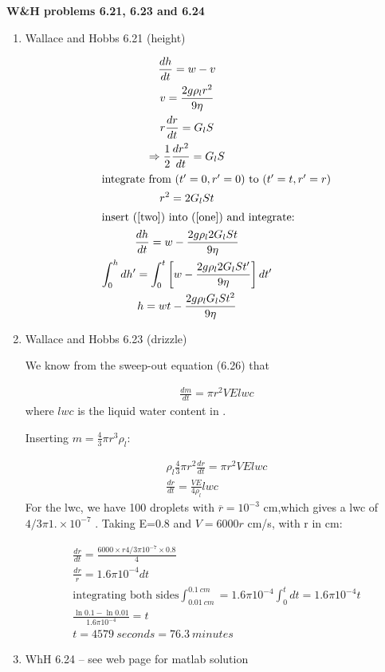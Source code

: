 \documentclass[12pt]{article}
\begin{document}
\begin{center}\textbf{
W\&H problems 6.21, 6.23 and 6.24}
\end{center}

\begin{enumerate}


\item Wallace and Hobbs 6.21 (height)

  \begin{gather}
    \frac{ dh}{dt}  = w - v \label{one} \\
  v = \frac{ 2 g \rho_l r^2}{9 \eta} \label{two}\\
r \frac{ dr}{dt}  = G_l S \\
\Rightarrow \frac{ 1}{2}\frac{dr^2 }{dt}   = G_l S \\
\intertext{integrate from $(t^\prime=0,r^\prime=0)$ to $(t^\prime=t,r^\prime = r$)}
r^2 = 2 G_l S t \label{two} \\
\intertext{insert (\ref{two}) into (\ref{one}) and integrate:}
    \frac{ dh}{dt}  = w - \frac{ 2 g \rho_l 2 G_l S t}{9 \eta} \label{three} \\
\int_0^h  dh^\prime = \int_0^t \left [ w - \frac{ 2 g \rho_l 2 G_l S t^\prime}{9 \eta} \right ] dt^\prime \\
h= wt - \frac{ 2 g \rho_l  G_l S t^2}{9 \eta}
  \end{gather}

\item Wallace and Hobbs 6.23 (drizzle)

We know from the sweep-out equation (6.26) that

\begin{gather}
  \frac{ dm}{dt}  = \pi r^2 V E lwc
\end{gather}
where $lwc$ is the liquid water content in .

Inserting $m=\frac{4 }{3}  \pi r^3 \rho_l$:

 \begin{gather}
   \rho_l \frac{ 4}{3} \pi r^2 \frac{dr}{dt}   = \pi r^2 V E lwc \\
 \frac{ dr}{dt} = \frac{ V E}{4 \rho_l} lwc
 \end{gather}
For the lwc, we have 100 droplets \cc with $\overline{r }= 10^{-3}$ cm,which gives a lwc of $4/3 \pi 1. \times 10^{-7}$  .  Taking
E=0.8 and $V=6000 r$ cm/s, with r in cm:

\begin{gather}
  \frac{ dr}{dt} = \frac{ 6000 \times r 4/3 \pi  10^{-7} \times 0.8}{4} \\
\frac{ dr}{r} = 1.6 \pi 10^{-4} dt \\
\text{integrating both sides} \nonumber 
\int_{0.01\ cm}^{0.1\ cm} = 1.6 \pi 10^{-4} \int_0^t dt = 1.6 \pi 10^{-4} t \\
\frac{\ln 0.1 - \ln 0.01 }{1.6 \pi 10^{-4}} = t \\
t = 4579\ seconds = 76.3\ minutes
\end{gather}


\item WhH 6.24 -- see web page for matlab solution

\end{enumerate}
\end{document}
